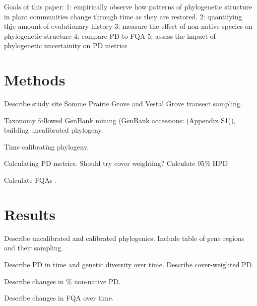 \documentclass[twocolumn,superscriptaddress,showkeys]{revtex4}
\begin{document}
Goals of this paper:
1: empirically observe how patterns of phylogenetic structure in plant communities change through time as they are restored.
2: quantifying thje amount of evolutionary history
3: measure the effect of non-native species on phylogenetic structure
4: compare PD to FQA
5: assess the impact of phylogenetic uncertainity on PD metrics


\section{Methods}

Describe study site Somme Prairie Grove and Vestal Grove transect sampling.


Taxonomy followed \cite{Herman2014} GenBank mining (GenBank accessions: (Appendix S1)), building uncalibrated phylogeny.


Time calibrating phylogeny.


Calculating PD metrics. Should try cover weighting? Calculate 95\% HPD


Calculate FQAs \cite{Freyman2013}.


\section{Results}

Describe uncalibrated and calibrated phylogenies. Include table of gene regions and their sampling.


Describe PD in time and genetic diversity over time. Describe cover-weighted PD.


Describe changes in \% non-native PD.


Describe changes in FQA over time.
\end{document}
